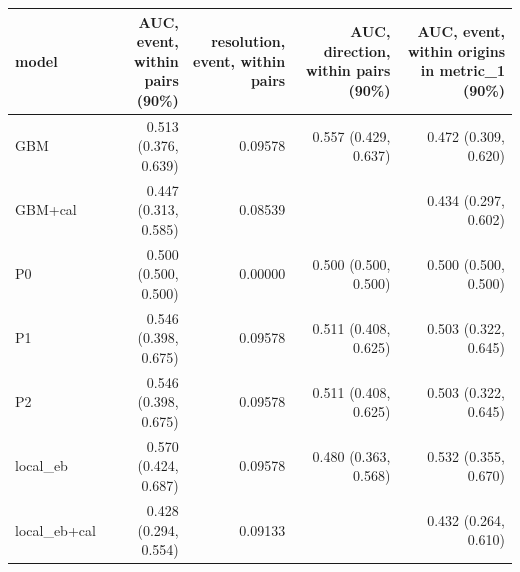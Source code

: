 \begin{tabular}{lrrrr}
\toprule
model & AUC, event, within pairs (90\%) & resolution, event, within pairs & AUC, direction, within pairs (90\%) & AUC, event, within origins in metric\_1 (90\%) \\
\midrule
GBM & 0.513 (0.376, 0.639) & 0.09578 & 0.557 (0.429, 0.637) & 0.472 (0.309, 0.620) \\
GBM+cal & 0.447 (0.313, 0.585) & 0.08539 &  & 0.434 (0.297, 0.602) \\
P0 & 0.500 (0.500, 0.500) & 0.00000 & 0.500 (0.500, 0.500) & 0.500 (0.500, 0.500) \\
P1 & 0.546 (0.398, 0.675) & 0.09578 & 0.511 (0.408, 0.625) & 0.503 (0.322, 0.645) \\
P2 & 0.546 (0.398, 0.675) & 0.09578 & 0.511 (0.408, 0.625) & 0.503 (0.322, 0.645) \\
local\_eb & 0.570 (0.424, 0.687) & 0.09578 & 0.480 (0.363, 0.568) & 0.532 (0.355, 0.670) \\
local\_eb+cal & 0.428 (0.294, 0.554) & 0.09133 &  & 0.432 (0.264, 0.610) \\
\bottomrule
\end{tabular}
